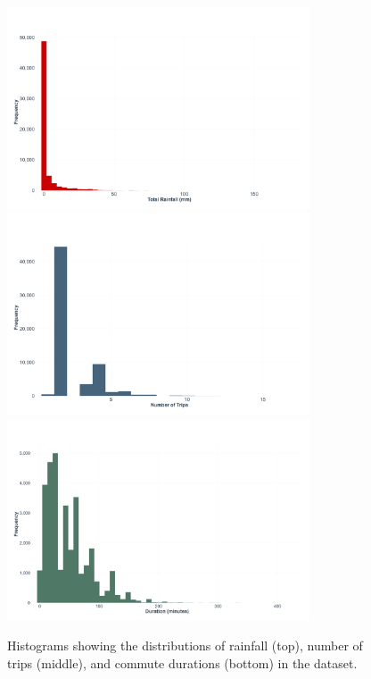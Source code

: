 \begin{figure}[H]
    \centering
    \includegraphics[width=0.8\textwidth]{../figures/rainfall_histogram.png}
    \includegraphics[width=0.8\textwidth]{../figures/trips_histogram.png}
    \includegraphics[width=0.8\textwidth]{../figures/duration_histogram.png}
    \caption{Histograms showing the distributions of rainfall (top), number of trips (middle), and commute durations (bottom) in the dataset.}
    \label{fig:hist}
\end{figure}

